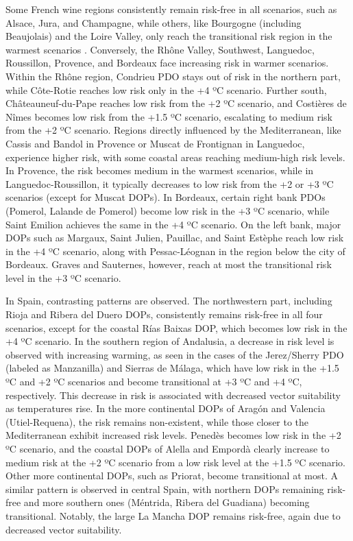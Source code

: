 Some French wine regions consistently remain risk-free in all scenarios, such
as Alsace, Jura, and Champagne, while others, like Bourgogne (including
Beaujolais) and the Loire Valley, only reach the transitional risk region in
the warmest scenarios . Conversely, the Rhône Valley, Southwest, Languedoc,
Roussillon, Provence, and Bordeaux face increasing risk in warmer scenarios.
Within the Rhône region, Condrieu PDO stays out of risk in the northern part,
while Côte-Rotie reaches low risk only in the +4 ºC scenario. Further south,
Châteauneuf-du-Pape reaches low risk from the +2 ºC scenario, and Costières de
Nîmes becomes low risk from the +1.5 ºC scenario, escalating to medium risk
from the +2 ºC scenario. Regions directly influenced by the Mediterranean, like
Cassis and Bandol in Provence or Muscat de Frontignan in Languedoc, experience
higher risk, with some coastal areas reaching medium-high risk levels. In
Provence, the risk becomes medium in the warmest scenarios, while in
Languedoc-Roussillon, it typically decreases to low risk from the +2 or +3 ºC
scenarios (except for Muscat DOPs). In Bordeaux, certain right bank PDOs
(Pomerol, Lalande de Pomerol) become low risk in the +3 ºC scenario, while
Saint Emilion achieves the same in the +4 ºC scenario. On the left bank, major
DOPs such as Margaux, Saint Julien, Pauillac, and Saint Estèphe reach low risk
in the +4 ºC scenario, along with Pessac-Léognan in the region below the city
of Bordeaux. Graves and Sauternes, however, reach at most the transitional risk
level in the +3 ºC scenario.

In Spain, contrasting patterns are observed. The northwestern part, including
Rioja and Ribera del Duero DOPs, consistently remains risk-free in all four
scenarios, except for the coastal Rías Baixas DOP, which becomes low risk in
the +4 ºC scenario. In the southern region of Andalusia, a decrease in risk
level is observed with increasing warming, as seen in the cases of the
Jerez/Sherry PDO (labeled as Manzanilla) and Sierras de Málaga, which have low
risk in the +1.5 ºC and +2 ºC scenarios and become transitional at +3 ºC and +4
ºC, respectively. This decrease in risk is associated with decreased vector
suitability as temperatures rise. In the more continental DOPs of Aragón and
Valencia (Utiel-Requena), the risk remains non-existent, while those closer to
the Mediterranean exhibit increased risk levels. Penedès becomes low risk in
the +2 ºC scenario, and the coastal DOPs of Alella and Empordà clearly increase
to medium risk at the +2 ºC scenario from a low risk level at the +1.5 ºC
scenario. Other more continental DOPs, such as Priorat, become transitional at
most. A similar pattern is observed in central Spain, with northern DOPs
remaining risk-free and more southern ones (Méntrida, Ribera del Guadiana)
becoming transitional. Notably, the large La Mancha DOP remains risk-free,
again due to decreased vector suitability.

